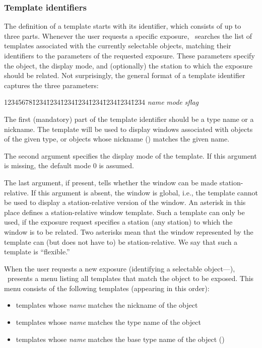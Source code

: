 \subsubsection{Template identifiers}
\label{rm_ds_tp_ti}

The definition of a template starts with its identifier, which consists of
up to three parts.
Whenever the user requests a specific exposure,
\dsd\ searches the list of templates associated with the currently
selectable objects, matching their identifiers to the parameters of the
requested exposure.
These parameters specify the object, the display mode, and (optionally)
the station to which the exposure should be related.
Not surprisingly, the general format of a template identifier captures
the three parameters:

{\tt\begin{tabbing}
12345678\=1234\=1234\=1234\=1234\=1234\=1234\=1234\=1234\kill
\> {\em name\/} {\em mode\/} {\em sflag}
\end{tabbing}}

The first (mandatory) part of the template identifier should be a type name
or a nickname.
The template will be used to display windows associated
with objects of the given type, or objects whose nickname
() matches the given name.

The second argument specifies the display mode of the template.
If this argument is missing, the default mode 0 is assumed.

The last argument, if present, tells whether the window can be made
station-relative.
If this argument is absent, the window is global, i.e.,
the template cannot be used to display a station-relative version of the
window.
An asterisk in this place defines a station-relative window template.
Such a template can only be used, if the exposure request specifies a station
(any station) to which the window is to be related.
Two asterisks mean that the window represented by the template can
(but does not have to) be station-relative.
We say that such a template is ``flexible.''

When the user requests a new exposure
(identifying a selectable object---),
\dsd\ presents a menu listing all templates that match the object to be
exposed.
This menu consists of the following templates (appearing in this order):
\begin{itemize}
\item
templates whose {\em name\/} matches the nickname of the object
\item
templates whose {\em name\/} matches the type name of the object
\item
templates whose {\em name\/} matches the base type name of the object
()
\end{itemize}

